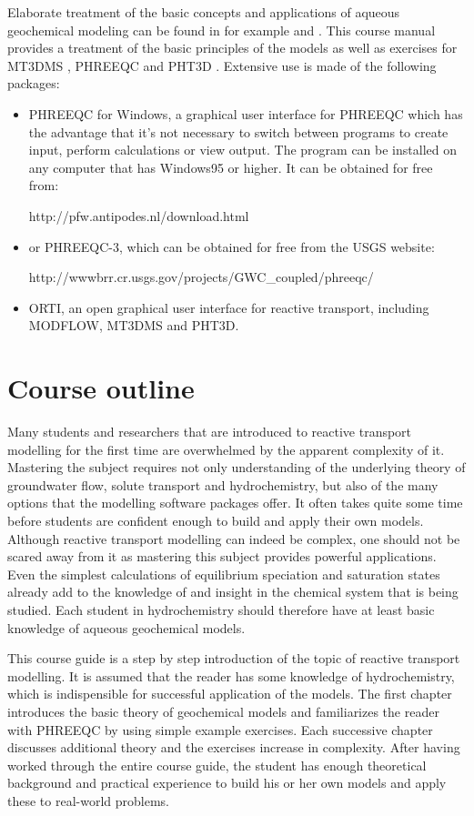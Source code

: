 Elaborate treatment of the basic concepts and applications of aqueous geochemical modeling can be found in for example \citet{bethke1996} and \citet{lichtner96}. This course manual provides a treatment of the basic principles of the models as well as exercises for MT3DMS \citep{zheng99}, PHREEQC \citep{phreeqc2} and PHT3D \citep{prommer_gw}. Extensive use is made of the following packages:

\begin{itemize}

\item PHREEQC for Windows, a graphical user interface for PHREEQC which has the advantage that it's not necessary to switch between programs to create input, perform calculations or view output. The program can be installed on any computer that has Windows95 or higher. It can be obtained for free from:

http://pfw.antipodes.nl/download.html

\item or PHREEQC-3, which can be obtained for free from the USGS website:

http://wwwbrr.cr.usgs.gov/projects/GWC\_coupled/phreeqc/

\item ORTI, an open graphical user interface for reactive transport, including MODFLOW, MT3DMS and PHT3D.

\end{itemize}

\section*{Course outline}
Many students and researchers that are introduced to reactive transport modelling for the first time are overwhelmed by the apparent complexity of it. Mastering the subject requires not only understanding of the underlying theory of groundwater flow, solute transport and hydrochemistry, but also of the many options that the modelling software packages offer. It often takes quite some time before students are confident enough to build and apply their own models. Although reactive transport modelling can indeed be complex, one should not be scared away from it as mastering this subject provides powerful applications. Even the simplest calculations of equilibrium speciation and saturation states already add to the knowledge of and insight in the chemical system that is being studied. Each student in hydrochemistry should therefore have at least basic knowledge of aqueous geochemical models.

This course guide is a step by step introduction of the topic of reactive transport modelling. It is assumed that the reader has some knowledge of hydrochemistry, which is indispensible for successful application of the models. The first chapter introduces the basic theory of geochemical models and familiarizes the reader with PHREEQC by using simple example exercises. Each successive chapter discusses additional theory and the exercises increase in complexity. After having worked through the entire course guide, the student has enough theoretical background and practical experience to build his or her own models and apply these to real-world problems.

